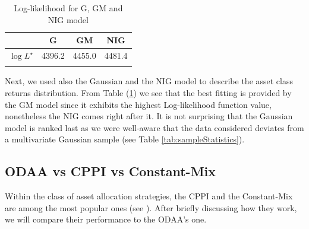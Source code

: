 \begin{table}
	\centering
	\begin{tabular}{@{}*{4}{c}@{}}
		\toprule
		& G & GM & NIG \\
		\midrule	
		$\log L^{\star}$ & 4396.2& 4455.0  & 4481.4\\
		\addlinespace[0.5em]	
		\bottomrule
	\end{tabular}
	\caption{Log-likelihood for G, GM and NIG model}
	\label{tab:LogL_models}
\end{table}

Next, we used also the Gaussian and the NIG model to describe the asset class returns distribution. From Table (\ref{tab:LogL_models}) we see that the best fitting is provided by the GM model since it exhibits the highest Log-likelihood function value, nonetheless the NIG comes right after it. It is not surprising that the Gaussian model is ranked last as we were well-aware that the data considered deviates from a multivariate Gaussian sample (see Table \ref{tab:sampleStatistics}).


\subsection{ODAA vs CPPI vs Constant-Mix}
Within the class of asset allocation strategies, the \gls{CPPI} and the Constant-Mix are among the most popular ones (see \cite{Perold1988}). After briefly discussing how they work, we will compare their performance to the ODAA's one.
